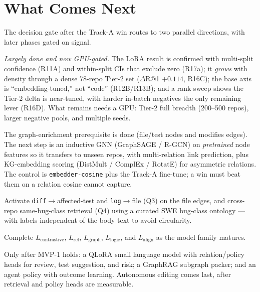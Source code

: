\documentclass[11pt]{article}
\newcommand{\code}[1]{\texttt{#1}}
\newcommand{\rel}[1]{\textsf{#1}}
\begin{document}
\section{What Comes Next}
\label{sec:next}

The decision gate after the Track-A win routes to two parallel directions, with later
phases gated on signal.

\begin{description}[leftmargin=1.4em,style=nextline]
\item[Scale the win (Track D).] \emph{Largely done and now GPU-gated.} The LoRA result
is confirmed with multi-split confidence (R11A) and within-split CIs that exclude zero
(R17a); it \emph{grows} with density through a dense 78-repo Tier-2 set
($\Delta$R@1 $+0.114$, R16C); the base axis is ``embedding-tuned,'' not ``code''
(R12B/R13B); and a rank sweep shows the Tier-2 delta is near-tuned, with harder in-batch
negatives the only remaining lever (R16D). What remains needs a GPU: Tier-2 full breadth
(200--500 repos), larger negative pools, and multiple seeds.
\item[Graph link prediction (Track B).] The graph-enrichment prerequisite is done
(file/test nodes and \rel{modifies} edges). The next step is an inductive GNN
(GraphSAGE / R-GCN) on \emph{pretrained} node features so it transfers to unseen
repos, with multi-relation link prediction, plus KG-embedding scoring (DistMult /
ComplEx / RotatE) for asymmetric relations. The control is \code{embedder-cosine}
plus the Track-A fine-tune; a win must beat them on a relation cosine cannot capture.
\item[Tasks and labels (Track C).] Activate \code{diff}$\to$affected-test and
\code{log}$\to$file (Q3) on the file edges, and cross-repo same-bug-class retrieval
(Q4) using a curated SWE bug-class ontology --- with labels independent of the body
text to avoid circularity.
\item[Remaining losses.] Complete $L_{\text{contrastive}}$, $L_{\text{rel}}$,
$L_{\text{graph}}$, $L_{\text{logic}}$, and $L_{\text{align}}$ as the model family
matures.
\item[Relational SLM (MVP-2+, Track E).] Only after MVP-1 holds: a QLoRA small
language model with relation/policy heads for review, test suggestion, and risk; a
GraphRAG subgraph packer; and an agent policy with outcome learning. Autonomous
editing comes last, after retrieval and policy heads are measurable.
\end{description}
\end{document}
